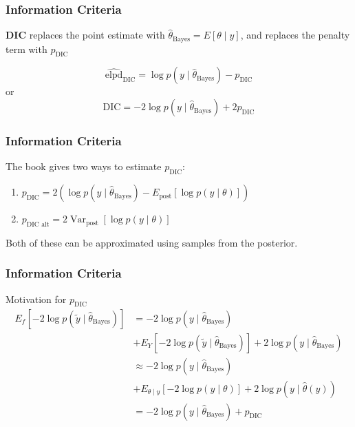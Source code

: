 \documentclass{beamer}
\begin{document}
\begin{frame}
\frametitle{Information Criteria}

{\bf DIC} replaces the point estimate with $\hat{\theta}_{\text{Bayes}} = E[\theta \mid y]$, and replaces the penalty term with $p_{\text{DIC}}$
\newline

\[
\widehat{\text{elpd}}_{\text{DIC}} = \log p(y \mid \hat{\theta}_{\text{Bayes}}) - p_{\text{DIC}}
\]
or
\[
\text{DIC} = -2\log p(y \mid \hat{\theta}_{\text{Bayes}}) +2 p_{\text{DIC}}
\]

\end{frame}

\begin{frame}
\frametitle{Information Criteria}

The book gives two ways to estimate $p_{\text{DIC}}$:

\begin{enumerate}
\item $p_{\text{DIC}} = 2\left(\log p(y \mid \hat{\theta}_{\text{Bayes}}) - E_{\text{post}}\left[ \log p(y \mid \theta) \right] \right)$
\item $p_{\text{DIC alt}} = 2 \operatorname{Var}_{\text{post}}\left[ \log p(y \mid \theta) \right]$
\end{enumerate}

Both of these can be approximated using samples from the posterior.

\end{frame}

\begin{frame}
\frametitle{Information Criteria}

Motivation for $p_{\text{DIC}}$
\begin{align*}
E_f\left[-2  \log p(\tilde{y} \mid \hat{\theta}_{\text{Bayes}})  \right] &= - 2\log p(y \mid \hat{\theta}_{\text{Bayes}}) \\
&+ E_Y\left[  -2\log p(\tilde{y} \mid \hat{\theta}_{\text{Bayes}})  \right] + 2\log p(y \mid \hat{\theta}_{\text{Bayes}})\\
&\approx - 2\log p(y \mid \hat{\theta}_{\text{Bayes}}) \\
&+  E_{\theta \mid y}\left[ - 2 \log p(y \mid \theta) \right] + 2 \log p(y \mid \hat{\theta}(y)) \\
&= - 2\log p(y \mid \hat{\theta}_{\text{Bayes}}) + p_{\text{DIC}}
\end{align*}


\end{frame}
\end{document}
